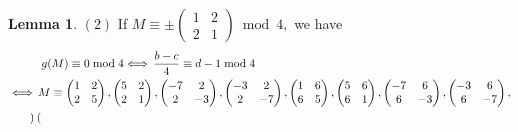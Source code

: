 \documentclass[12pt]{article}
\theoremstyle{definition}
\newtheorem{lemma}[theorem]{Lemma}
\numberwithin{equation}{section}
\numberwithin{theorem}{section}
\begin{document}
\begin{lemma}
{%
$\mathrm{(2)}$ If 
$
M
\equiv
\pm
\begin{pmatrix}
1 & 2 \\
2 & 1
\end{pmatrix}
\bmod{4},
$ 
we have  
\begin{align*}
&\hspace{10mm} g(M)\equiv 0 \bmod{4} 
\Longleftrightarrow
\, \frac{b-c}{4}\equiv d-1 \bmod{4} \notag \\
&\Longleftrightarrow \, 
M
\equiv 
\begin{pmatrix}
1 & 2 \\
2 & 5
\end{pmatrix}, 
\begin{pmatrix}
5 & 2 \\
2 & 1
\end{pmatrix}, 
\begin{pmatrix}
-7 & 2 \\
2 & -3
\end{pmatrix}, 
\begin{pmatrix}
-3 & 2 \\
2 & -7
\end{pmatrix}, 
\begin{pmatrix}
1 & 6 \\
6 & 5
\end{pmatrix}, 
\begin{pmatrix}
5 & 6 \\
6 & 1
\end{pmatrix}, 
\begin{pmatrix}
-7 & 6 \\
6 & -3
\end{pmatrix}, 
\begin{pmatrix}
-3 & 6 \\
6 & -7
\end{pmatrix},   \\
&\hspace{8mm}
\begin{pmatrix}

\end{pmatrix}
\end{align*}}
\end{lemma}
\end{document}
